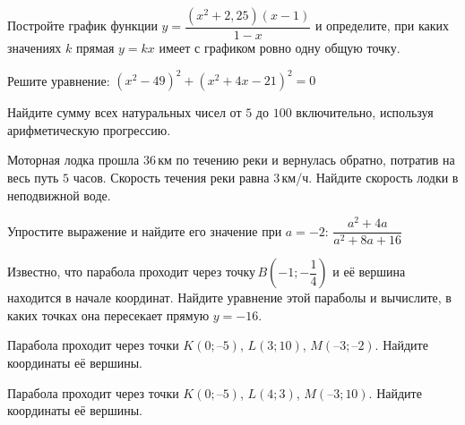 \begin{homework}[number=2]
	\begin{listofex}
		\item Постройте график функции \( y=\dfrac{(x^2+2,25)(x-1)}{1-x} \) и определите, при каких значениях \( k \) прямая \( y=kx \) имеет с графиком ровно одну общую точку.
		\item Решите уравнение: \quad \( (x^2-49)^2+(x^2+4x-21)^2=0 \)
		\item Найдите сумму всех натуральных чисел от \( 5 \) до \( 100 \) включительно, используя арифметическую прогрессию.
	\end{listofex}
\end{homework}

\begin{class}[number=5]
	\begin{listofex}
		\item \exercise{1478}
		\item Моторная лодка прошла \( 36 \) км по течению реки и вернулась обратно, потратив на весь путь \( 5 \) часов. Скорость течения реки равна \( 3 \) км/ч. Найдите скорость лодки в неподвижной воде.
		\item Упростите выражение и найдите его значение при \( a=-2 \): \quad \( \dfrac{a^2+4a}{a^2+8a+16} \)
		\item Известно, что парабола проходит через точку \( B\left( -1;-\dfrac{1}{4} \right) \) и её вершина находится в начале координат. Найдите уравнение этой параболы и вычислите, в каких точках она пересекает прямую \( y=-16 \). 
		\item Парабола проходит через точки \( K(0; –5) \), \( L(3; 10) \), \( M( –3; –2) \). Найдите координаты её вершины.
		\item Парабола проходит через точки \( K(0; –5) \), \( L(4; 3) \), \( M(–3; 10) \). Найдите координаты её вершины.
		\item \exercise{640}
	\end{listofex}
\end{class}

